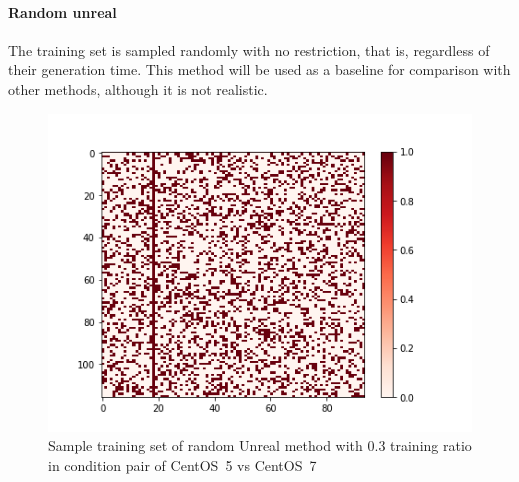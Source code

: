 \documentclass[10pt, conference, compsocconf]{IEEEtran}
\begin{document}
\paragraph{Random unreal}
The training set is sampled randomly with no restriction, that is,
regardless of their generation time.  This method will be used as a
baseline for comparison with other methods, although it is not
realistic.
\begin{figure}
\includegraphics[width=\columnwidth]{figures/5vs7_random-unreal_03_training_plot}
  \caption{Sample training set of random Unreal method with 0.3 training ratio in condition pair of CentOS~5 vs CentOS~7}
  \label{fig:Sample Training set }
\end{figure}

\end{document}
